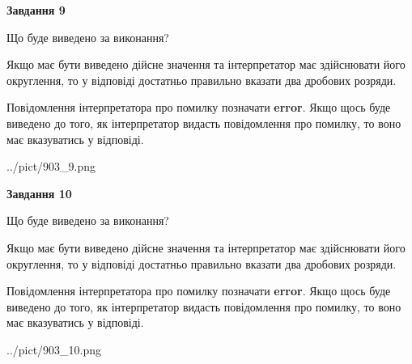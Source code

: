\documentclass[12pt, ukrainian]{article}
\begin{document}
{\begin {Large}
{\begin {center}\textbf{Завдання 9}\end {center}}\par
Що буде виведено за виконання? \par

Якщо має бути виведено дійсне значення та інтерпретатор має здійснювати його округлення, 
то у відповіді достатньо правильно вказати два дробових розряди.

Повідомлення інтерпретатора про помилку позначати \textbf{error}.
Якщо щось буде виведено до того, як інтерпретатор видасть повідомлення про помилку, 
то воно має вказуватись у відповіді. \par

\begin{center}
	{../pict/903_9.png}
\end{center}
\newpage

{\begin {center}\textbf{Завдання 10}\end {center}}\par
Що буде виведено за виконання? \par

Якщо має бути виведено дійсне значення та інтерпретатор має здійснювати його округлення, 
то у відповіді достатньо правильно вказати два дробових розряди.

Повідомлення інтерпретатора про помилку позначати \textbf{error}.
Якщо щось буде виведено до того, як інтерпретатор видасть повідомлення про помилку, 
то воно має вказуватись у відповіді. \par

\begin{center}
	{../pict/903_10.png}
\end{center}
\newpage

\end {Large}}
\end{document}
